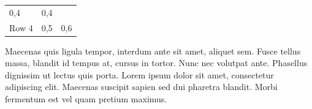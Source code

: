 \begin{longtable}[htbp]{@{}lll@{}}
\begin{minipage}[t]{0.16666666666666666\columnwidth}
0,4\strut
\end{minipage} & \begin{minipage}[t]{0.1388888888888889\columnwidth}\raggedright
0,4\strut
\end{minipage}\tabularnewline\begin{minipage}[t]{0.1388888888888889\columnwidth}\raggedright
Row 4\strut
\end{minipage} & \begin{minipage}[t]{0.16666666666666666\columnwidth}\raggedright
0,5\strut
\end{minipage} & \begin{minipage}[t]{0.1388888888888889\columnwidth}\raggedright
0,6\strut
\end{minipage}\tabularnewline
\bottomrule
\end{longtable}

Maecenas quis ligula tempor, interdum ante sit amet, aliquet sem.
Fusce tellus massa, blandit id tempus at, cursus in tortor. Nunc nec
volutpat ante. Phasellus dignissim ut lectus quis porta. Lorem ipsum
dolor sit amet, consectetur adipiscing elit. Maecenas suscipit
sapien sed dui pharetra blandit. Morbi fermentum est vel quam
pretium maximus.

